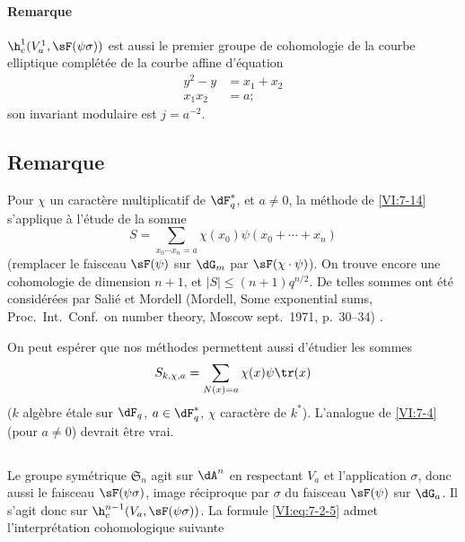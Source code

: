 \paragraph{Remarque}

$\h_c^1(V_a^1,\sF(\psi\sigma))$ est aussi le premier groupe de cohomologie de 
la courbe elliptique complétée de la courbe affine d'équation 
\begin{align*}
  y^2-y &= x_1+x_2 \\
  x_1 x_2 &= a \text{;} 
\end{align*}
son invariant modulaire est $j=a^{-2}$. 





\subsection{Remarque}\label{VI:7-18}

Pour $\chi$ un caractère multiplicatif de $\dF_q^\ast$, et $a\ne 0$, la 
méthode de \ref{VI:7-14} s'applique à l'étude de la somme 
\[
  S = \sum_{x_0\dotsm x_n = a} \chi(x_0) \psi(x_0+\cdots + x_n) 
\]
(remplacer le faisceau $\sF(\psi)$ sur $\dG_m$ par $\sF(\chi\cdot \psi)$). On 
trouve encore une cohomologie de dimension $n+1$, et 
$|S|\leqslant (n+1)q^{n/2}$. De telles sommes ont été considérées par 
Salié et Mordell (Mordell, Some exponential sums, Proc.~Int.~Conf.~on number theory, Moscow sept.~1971, p.~30--34) \cite{mo73}.

On peut espérer que nos méthodes permettent aussi d'étudier les sommes 
\[
  S_{k,\chi,a} = \sum_{N(x)=a} \chi(x) \psi \tr(x) 
\]
($k$ algèbre étale sur $\dF_q$, $a\in \dF_q^\ast$, $\chi$ caractère de 
$k^\ast$). L'analogue de \ref{VI:7-4} (pour $a\ne 0$) devrait être vrai. 





\subsection{}\label{VI:7-19}

Le groupe symétrique $\mathfrak{S}_n$ agit sur $\dA^n$ en respectant $V_a$ et 
l'application $\sigma$, donc aussi le faisceau $\sF(\psi\sigma)$, image 
réciproque par $\sigma$ du faisceau $\sF(\psi)$ sur $\dG_a$. Il s'agit donc 
sur $\h_c^{n-1}(V_a,\sF(\psi\sigma))$. La formule \eqref{VI:eq:7-2-5} admet 
l'interprétation cohomologique suivante





